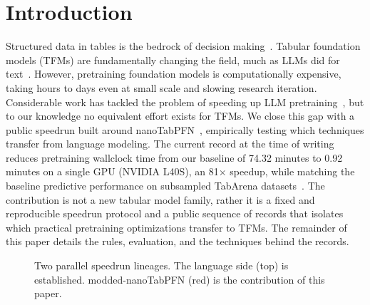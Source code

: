 \documentclass{article}
\theoremstyle{plain}
\theoremstyle{definition}
\theoremstyle{remark}
\begin{document}
\section{Introduction}
Structured data in tables is the bedrock of decision making~\citep{borisov2024dnntabular,vanbreugel2024position}.
Tabular foundation models (TFMs) are fundamentally changing the field, much as LLMs did for text~\citep{hollmann2023tabpfn,hollmann2025tabpfnv2,grinsztajn2026tabpfn25advancingstateart,qu2025tabicl,qu2026tabiclv2,ma2025tabdpt,zhang2025limix}.
However, pretraining foundation models is computationally expensive, taking hours to days even at small scale and slowing research iteration.
Considerable work has tackled the problem of speeding up LLM pretraining~\citep{moddednanogpt,geiping2023cramming,deepseekv3,parametergolf2026}, but to our knowledge no equivalent effort exists for TFMs.
We close this gap with a public speedrun built around nanoTabPFN~\citep{pfefferle2025nanotabpfn}, empirically testing which techniques transfer from language modeling.
The current record at the time of writing reduces pretraining wallclock time from our baseline of 74.32 minutes to 0.92 minutes on a single GPU (NVIDIA L40S), an 81$\times$ speedup, while matching the baseline predictive performance on subsampled TabArena datasets~\citep{erickson2025tabarena}.
The contribution is not a new tabular model family, rather it is a fixed and reproducible speedrun protocol and a public sequence of records that isolates which practical pretraining optimizations transfer to TFMs.
The remainder of this paper details the rules, evaluation, and the techniques behind the records.

\begin{figure}[t]
  \centering
  \caption{Two parallel speedrun lineages. The language side (top) is established. modded-nanoTabPFN (red) is the contribution of this paper.}
  \label{fig:lineage}
\end{figure}
\end{document}

